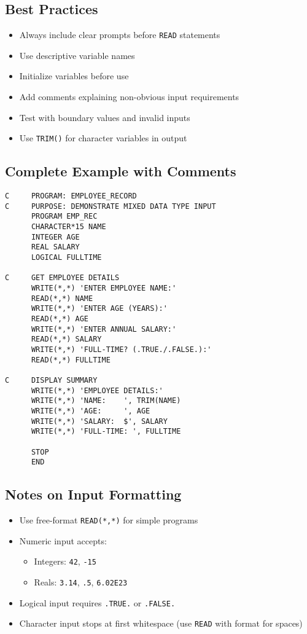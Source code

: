 \documentclass{book}
\begin{document}
\subsection*{Best Practices}
\begin{itemize}
    \item Always include clear prompts before \texttt{READ} statements
    \item Use descriptive variable names
    \item Initialize variables before use
    \item Add comments explaining non-obvious input requirements
    \item Test with boundary values and invalid inputs
    \item Use \texttt{TRIM()} for character variables in output
\end{itemize}

\subsection*{Complete Example with Comments}
\begin{verbatim}
C     PROGRAM: EMPLOYEE_RECORD
C     PURPOSE: DEMONSTRATE MIXED DATA TYPE INPUT
      PROGRAM EMP_REC
      CHARACTER*15 NAME
      INTEGER AGE
      REAL SALARY
      LOGICAL FULLTIME

C     GET EMPLOYEE DETAILS
      WRITE(*,*) 'ENTER EMPLOYEE NAME:'
      READ(*,*) NAME
      WRITE(*,*) 'ENTER AGE (YEARS):'
      READ(*,*) AGE
      WRITE(*,*) 'ENTER ANNUAL SALARY:'
      READ(*,*) SALARY
      WRITE(*,*) 'FULL-TIME? (.TRUE./.FALSE.):'
      READ(*,*) FULLTIME

C     DISPLAY SUMMARY
      WRITE(*,*) 'EMPLOYEE DETAILS:'
      WRITE(*,*) 'NAME:    ', TRIM(NAME)
      WRITE(*,*) 'AGE:     ', AGE
      WRITE(*,*) 'SALARY:  $', SALARY
      WRITE(*,*) 'FULL-TIME: ', FULLTIME

      STOP
      END
\end{verbatim}

\subsection*{Notes on Input Formatting}
\begin{itemize}
    \item Use free-format \texttt{READ(*,*)} for simple programs
    \item Numeric input accepts:
    \begin{itemize}
        \item Integers: \texttt{42}, \texttt{-15}
        \item Reals: \texttt{3.14}, \texttt{.5}, \texttt{6.02E23}
    \end{itemize}
    \item Logical input requires \texttt{.TRUE.} or \texttt{.FALSE.}
    \item Character input stops at first whitespace (use \texttt{READ} with format for spaces)
\end{itemize}
\end{document}
